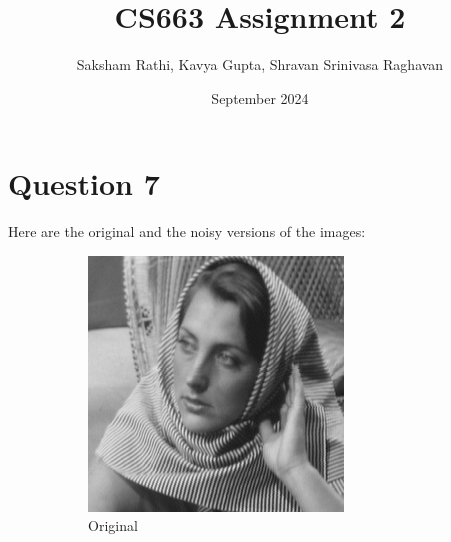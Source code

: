 \documentclass[12pt]{article}
\title{{\bf CS663 Assignment 2}}
\author{Saksham Rathi, Kavya Gupta, Shravan Srinivasa Raghavan}
\date{September 2024}
\begin{document}
\maketitle
\clearpage
\tableofcontents
\clearpage
\section*{Question 7}
Here are the original and the noisy versions of the images:
\begin{figure}[h]
    \centering
    \begin{subfigure}[b]{0.3\textwidth}
        \centering
        \includegraphics[width=\textwidth]{../images/barbara256.png}
        \caption{Original}
        \label{fig:subfig1}
    \end{subfigure}
    \begin{subfigure}[b]{0.3\textwidth}
        \centering

\end{subfigure}
\end{figure}
\end{document}
